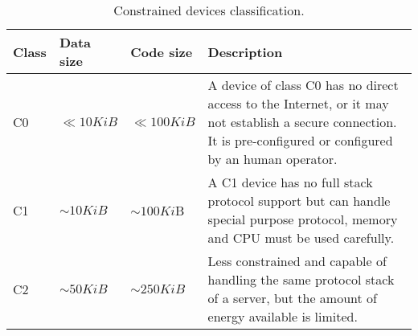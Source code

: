 	\begin{table}[h!]
		\begin{center}
			\begin{tabularx}{\textwidth}{|l|l|l|X|}
				\hline
				\textbf{Class} & \textbf{Data size} & \textbf{Code size} & \textbf{Description}\\
				\hline
				C0 & $\ll 10KiB$  & $\ll  100KiB$ &A device of class C0 has no direct access to the Internet,
												   or it may not establish a secure connection.
												   It is pre-configured or configured by an human operator.\\
				\hline
				C1 & $\sim 10KiB$ & $\sim 100Ki$B &A C1 device has no full stack protocol support
													but can handle special purpose protocol,
													memory and CPU must be used carefully.\\
				\hline
				C2 & $\sim 50KiB$ & $\sim 250KiB$ &Less constrained and capable of handling
												   the same protocol stack of a server,
												   but the amount of energy available is limited.\\
   				\hline
			\end{tabularx}
			\caption{Constrained devices classification.}
			\label{tab:table1}
		\end{center}
	\end{table}